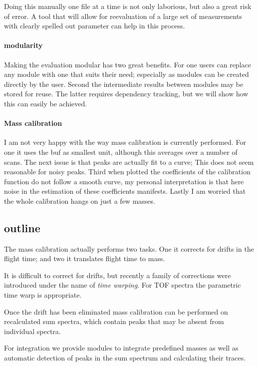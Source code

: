 Doing this manually one file at a time is not only laborious, but also a
great risk of error. A tool that will allow for reevaluation of a large
set of measurements with clearly spelled out parameter can help in this
process.


\paragraph{modularity}

Making the evaluation modular has two great benefits.  For one users can
replace any module with one that suits their need; especially as modules
can be created directly by the user. Second the intermediate
results between modules may be stored for reuse.  The latter requires
dependency tracking, but we will show how this can easily be achieved.

\paragraph{Mass calibration}

I am not very happy with the way mass calibration is currently
performed.  For one it uses the buf as smallest unit, although this
averages over a number of scans.  The next issue is that peaks are
actually fit to a curve; This does not seem reasonable for noisy peaks.
Third when plotted the coefficients of the calibration function do not
follow a smooth curve, my personal interpretation is that here noise
in the estimation of these coefficients manifests.  Lastly I am worried
that the whole calibration hangs on just a few masses.  

\subsection{outline}

The mass calibration actually performs two tasks. One it corrects for
drifts in the flight time; and two it translates flight time to mass.

It is difficult to correct for drifts, but recently a family of
corrections were introduced under the name of \emph{time warping}.  For
TOF spectra the parametric time warp \citep{Eilers2004a} is appropriate.

Once the drift has been eliminated mass calibration can be performed on
recalculated sum spectra, which contain peaks that may be absent from
individual spectra.

For integration we provide modules to integrate predefined masses as
well as automatic detection of peaks in the sum spectrum and calculating
their traces. 

